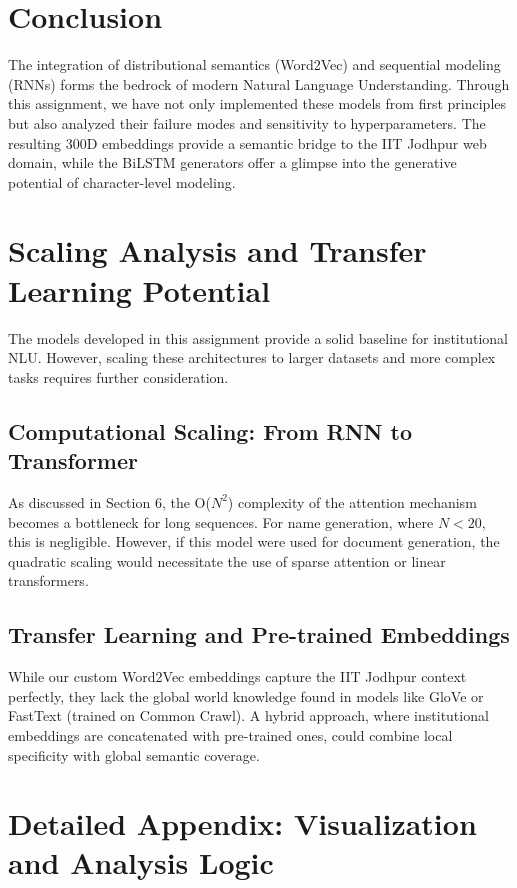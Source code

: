 \documentclass[12pt,a4paper]{article}
\begin{document}
\begin{itemize}
\newpage
\section{Conclusion}
The integration of distributional semantics (Word2Vec) and sequential modeling (RNNs) forms the bedrock of modern Natural Language Understanding. Through this assignment, we have not only implemented these models from first principles but also analyzed their failure modes and sensitivity to hyperparameters. The resulting 300D embeddings provide a semantic bridge to the IIT Jodhpur web domain, while the BiLSTM generators offer a glimpse into the generative potential of character-level modeling.

\section{Scaling Analysis and Transfer Learning Potential}
The models developed in this assignment provide a solid baseline for institutional NLU. However, scaling these architectures to larger datasets and more complex tasks requires further consideration.

\subsection{Computational Scaling: From RNN to Transformer}
As discussed in Section 6, the O($N^2$) complexity of the attention mechanism becomes a bottleneck for long sequences. For name generation, where $N < 20$, this is negligible. However, if this model were used for document generation, the quadratic scaling would necessitate the use of sparse attention or linear transformers.

\subsection{Transfer Learning and Pre-trained Embeddings}
While our custom Word2Vec embeddings capture the IIT Jodhpur context perfectly, they lack the global world knowledge found in models like GloVe or FastText (trained on Common Crawl). A hybrid approach, where institutional embeddings are concatenated with pre-trained ones, could combine local specificity with global semantic coverage.

\section{Detailed Appendix: Visualization and Analysis Logic}


\end{itemize}
\end{document}
